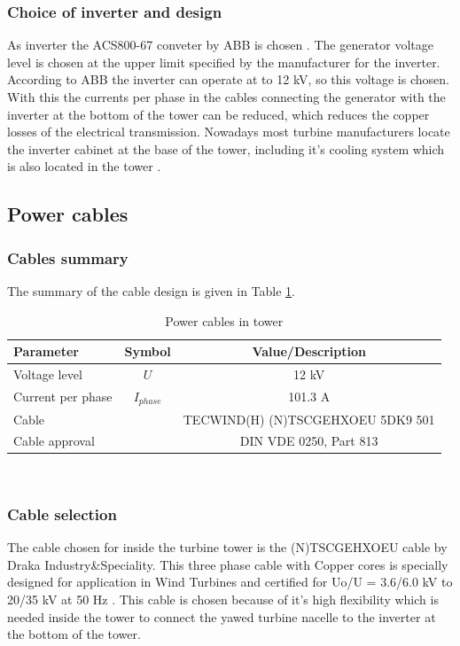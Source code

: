 \subsubsection{Choice of inverter and design}

As inverter the ACS800-67 conveter by ABB is chosen \cite{ABB}. The generator voltage level is chosen at the upper limit specified by the manufacturer for the inverter. According to ABB the inverter can operate at to 12 kV, so this voltage is chosen. With this the currents per phase in the cables connecting the generator with the inverter at the bottom of the tower can be reduced, which reduces the copper losses of the electrical transmission. Nowadays most turbine manufacturers locate the inverter cabinet at the base of the tower, including it's cooling system which is also located in the tower \cite{hau}.


\newpage
\subsection{Power cables}

\subsubsection{Cables summary}
The summary of the cable design is given in Table \ref{tab:power_cables}.

\begin{table}[h]
\centering
\caption{Power cables in tower}
\label{tab:power_cables}
\begin{tabular}{ |l|c|c|} 
\hline
\textbf{Parameter} & Symbol & \textbf{Value/Description}  \\ 
\hline
Voltage level & $U$ & 12 kV\\
\hline
Current per phase & $I_{phase}$ & 101.3 A\\
\hline
Cable & & TECWIND(H) (N)TSCGEHXOEU 5DK9 501  \\
\hline
Cable approval & & DIN VDE 0250, Part 813 \\
\hline
\end{tabular} \\
\end{table}

\subsubsection{Cable selection}

The cable chosen for inside the turbine tower is the (N)TSCGEHXOEU cable by Draka Industry\&Speciality. This three phase cable with Copper cores is specially designed for application in Wind Turbines and certified for  Uo/U = 3.6/6.0 kV to 20/35 kV at 50 Hz \cite{Draka}. This cable is chosen because of it's high flexibility which is needed inside the tower to connect the yawed turbine nacelle to the inverter at the bottom of the tower.

